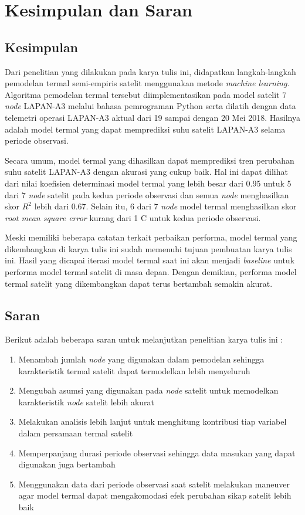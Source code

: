 \chapter{Kesimpulan dan Saran}

\section{Kesimpulan}

Dari penelitian yang dilakukan pada karya tulis ini, didapatkan langkah-langkah
pemodelan termal semi-empiris satelit menggunakan metode \textit{machine
learning}. Algoritma pemodelan termal tersebut diimplementasikan pada model
satelit 7 \textit{node} LAPAN-A3 melalui bahasa pemrograman Python serta
dilatih dengan data telemetri operasi LAPAN-A3 aktual dari 19 sampai dengan 20
Mei 2018. Hasilnya adalah model termal yang dapat memprediksi suhu satelit
LAPAN-A3 selama periode observasi.

Secara umum, model termal yang dihasilkan dapat memprediksi tren perubahan suhu
satelit LAPAN-A3 dengan akurasi yang cukup baik. Hal ini dapat dilihat dari
nilai koefisien determinasi model termal yang lebih besar dari 0.95 untuk 5
dari 7 \textit{node} satelit pada kedua periode observasi dan semua
\textit{node} menghasilkan skor $R^2$ lebih dari 0.67. Selain itu, 6 dari 7
\textit{node} model termal menghasilkan skor \textit{root mean square error}
kurang dari 1 \degree C untuk kedua periode observasi.

Meski memiliki beberapa catatan terkait perbaikan performa, model termal yang
dikembangkan di karya tulis ini sudah memenuhi tujuan pembuatan karya tulis
ini. Hasil yang dicapai iterasi model termal saat ini akan menjadi
\textit{baseline} untuk performa model termal satelit di masa depan. Dengan
demikian, performa model termal satelit yang dikembangkan dapat terus bertambah
semakin akurat.

\section{Saran}

Berikut adalah beberapa saran untuk melanjutkan penelitian karya tulis ini :

\begin{enumerate}
\item Menambah jumlah \textit{node} yang digunakan dalam pemodelan sehingga karakteristik termal satelit dapat termodelkan lebih menyeluruh
\item Mengubah asumsi yang digunakan pada \textit{node} satelit untuk memodelkan karakteristik \textit{node} satelit lebih akurat
\item Melakukan analisis lebih lanjut untuk menghitung kontribusi tiap variabel dalam persamaan termal satelit
\item Memperpanjang durasi periode observasi sehingga data masukan yang dapat digunakan juga bertambah
\item Menggunakan data dari periode observasi saat satelit melakukan maneuver agar model termal dapat mengakomodasi efek perubahan sikap satelit lebih baik
\end{enumerate}
